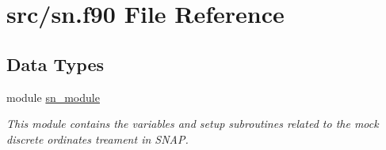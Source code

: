\hypertarget{sn_8f90}{\section{src/sn.f90 File Reference}
\label{sn_8f90}
}
\subsection*{Data Types}
\begin{DoxyCompactItemize}
\item 
module \hyperlink{classsn__module}{sn\-\_\-module}
\begin{DoxyCompactList}\small\item\em This module contains the variables and setup subroutines related to the mock discrete ordinates treament in S\-N\-A\-P. \end{DoxyCompactList}\end{DoxyCompactItemize}
